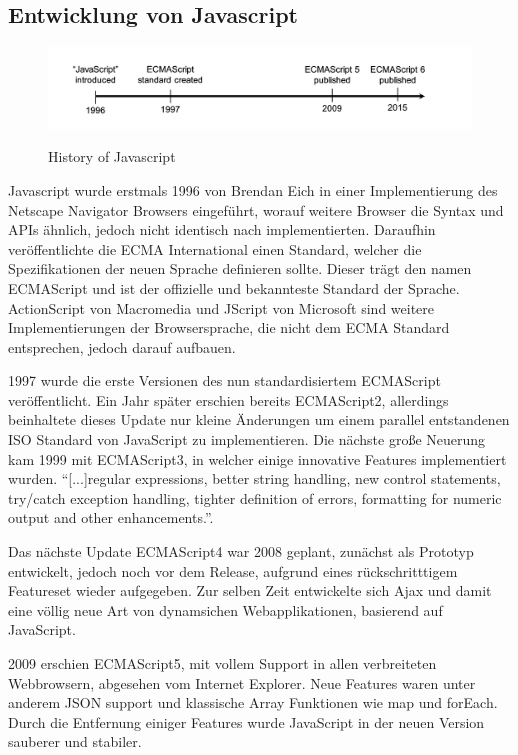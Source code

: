 \subsection{Entwicklung von Javascript}

\begin{figure}[ht]
 \centering
 \includegraphics[width=\linewidth]{kapitel2/javascript-timeline.png}
 \caption{History of Javascript}\cite[28]{EssentialTS}
\end{figure}

Javascript wurde erstmals 1996 von Brendan Eich in einer Implementierung des Netscape Navigator Browsers eingeführt,
worauf weitere Browser die Syntax und APIs ähnlich, jedoch nicht identisch nach implementierten.
Daraufhin veröffentlichte die ECMA International einen Standard, welcher die Spezifikationen der neuen Sprache
definieren sollte. Dieser trägt den namen ECMAScript und ist der offizielle und bekannteste Standard der
Sprache. ActionScript von Macromedia und JScript von Microsoft sind weitere Implementierungen der Browsersprache,
die nicht dem ECMA Standard entsprechen, jedoch darauf aufbauen.

1997 wurde die erste Versionen des nun standardisiertem ECMAScript veröffentlicht. Ein Jahr später erschien bereits ECMAScript2,
allerdings beinhaltete dieses Update nur kleine Änderungen um einem parallel entstandenen ISO Standard von JavaScript zu implementieren.
Die nächste große Neuerung kam 1999 mit ECMAScript3, in welcher einige innovative Features implementiert wurden.
``[...]regular expressions, better string handling, new control statements, try/catch exception handling, tighter definition of errors, formatting for numeric output and other enhancements.''\cite{js-vs-es}.

Das nächste Update ECMAScript4 war 2008 geplant, zunächst als Prototyp entwickelt,
jedoch noch vor dem Release, aufgrund eines rückschritttigem Featureset wieder aufgegeben.
Zur selben Zeit entwickelte sich Ajax und damit eine völlig neue Art von dynamsichen Webapplikationen,
basierend auf JavaScript.

2009 erschien ECMAScript5, mit vollem Support in allen verbreiteten Webbrowsern, abgesehen vom Internet Explorer.
Neue Features waren unter anderem JSON support und klassische Array Funktionen wie map und forEach.
Durch die Entfernung einiger Features wurde JavaScript in der neuen Version sauberer und stabiler.

